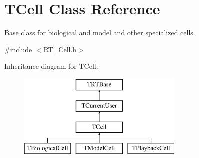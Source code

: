 \hypertarget{class_t_cell}{\section{T\+Cell Class Reference}
\label{class_t_cell}
}


Base class for biological and model and other specialized cells.  




{\ttfamily \#include $<$R\+T\+\_\+\+Cell.\+h$>$}

Inheritance diagram for T\+Cell\+:\begin{figure}[H]
\begin{center}
\leavevmode
\includegraphics[height=4.000000cm]{class_t_cell}
\end{center}
\end{figure}

